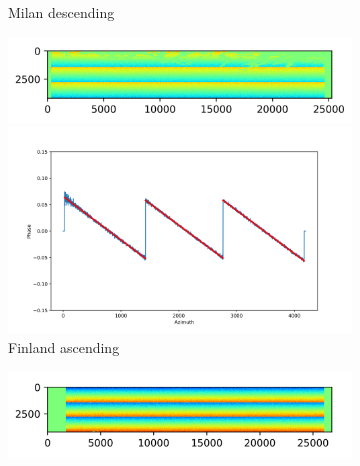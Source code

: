 \documentclass[preprint, authoryear]{elsarticle}
\begin{document}
\begin{figure}
\begin{subfigure}{0.5\textwidth}
\begin{minipage}{0.5\textwidth}
        \end{minipage}
        \caption{Milan descending}
        \label{fig_5g}
    \end{subfigure}%
    \hfill
    \begin{subfigure}{0.5\textwidth}
        \centering
        \begin{minipage}{0.5\textwidth}
            \centering
            \includegraphics[width=\textwidth]{figure/The cross-interferogram/cross_interf_Finland_asc.png}
        \end{minipage}%
        \begin{minipage}{0.5\textwidth}
            \centering
            \includegraphics[width=\textwidth]{figure/The cross-interferogram/cross_interf_Finland_asc_row&fitted_20230102.png}
        \end{minipage}
        \caption{Finland ascending}
        \label{fig_5h}
    \end{subfigure}%
    \begin{subfigure}{0.5\textwidth}
        \centering
        \begin{minipage}{0.5\textwidth}
            \centering
            \includegraphics[width=\textwidth]{figure/The cross-interferogram/cross_interf_Finland_des.png}

\end{minipage}
\end{subfigure}
\end{figure}
\end{document}
